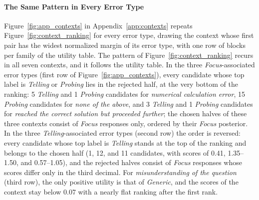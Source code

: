     \paragraph{The Same Pattern in Every Error Type}
    Figure~\ref{fig:app_contexts} in Appendix~\ref{app:contexts} repeats Figure~\ref{fig:context_ranking} for every error type, drawing the context whose first pair has the widest normalized margin of its error type, with one row of blocks per family of the utility table. The pattern of Figure~\ref{fig:context_ranking} recurs in all seven contexts, and it follows the utility table. In the three \textit{Focus}-associated error types (first row of Figure~\ref{fig:app_contexts}), every candidate whose top label is \textit{Telling} or \textit{Probing} lies in the rejected half, at the very bottom of the ranking: 5 \textit{Telling} and 1 \textit{Probing} candidates for \textit{numerical calculation error}, 15 \textit{Probing} candidates for \textit{none of the above}, and 3 \textit{Telling} and 1 \textit{Probing} candidates for \textit{reached the correct solution but proceeded further}; the chosen halves of these three contexts consist of \textit{Focus} responses only, ordered by their \textit{Focus} posterior. In the three \textit{Telling}-associated error types (second row) the order is reversed: every candidate whose top label is \textit{Telling} stands at the top of the ranking and belongs to the chosen half (1, 12, and 11 candidates, with scores of 0.41, 1.35--1.50, and 0.57--1.05), and the rejected halves consist of \textit{Focus} responses whose scores differ only in the third decimal. For \textit{misunderstanding of the question} (third row), the only positive utility is that of \textit{Generic}, and the scores of the context stay below 0.07 with a nearly flat ranking after the first rank.

